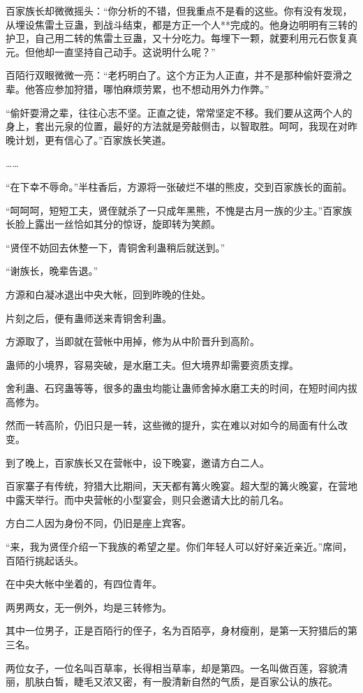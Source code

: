 \begin{this_body}
百家族长却微微摇头：“你分析的不错，但我重点不是看的这些。你有没有发现，从埋设焦雷土豆蛊，到战斗结束，都是方正一个人**完成的。他身边明明有三转的护卫，自己用二转的焦雷土豆蛊，又十分吃力。每埋下一颗，就要利用元石恢复真元。但他却一直坚持自己动手。这说明什么呢？”

百陌行双眼微微一亮：“老朽明白了。这个方正为人正直，并不是那种偷奸耍滑之辈。他答应参加狩猎，哪怕麻烦劳累，也不想动用外力作弊。”

“偷奸耍滑之辈，往往心志不坚。正直之徒，常常坚定不移。我们要从这两个人的身上，套出元泉的位置，最好的方法就是旁敲侧击，以智取胜。呵呵，我现在对昨晚计划，更有信心了。”百家族长笑道。

……

“在下幸不辱命。”半柱香后，方源将一张破烂不堪的熊皮，交到百家族长的面前。

“呵呵呵，短短工夫，贤侄就杀了一只成年黑熊，不愧是古月一族的少主。”百家族长脸上露出一丝恰如其分的惊讶，旋即转为笑颜。

“贤侄不妨回去休整一下，青铜舍利蛊稍后就送到。”

“谢族长，晚辈告退。”

方源和白凝冰退出中央大帐，回到昨晚的住处。

片刻之后，便有蛊师送来青铜舍利蛊。

方源取了，当即就在营帐中用掉，修为从中阶晋升到高阶。

蛊师的小境界，容易突破，是水磨工夫。但大境界却需要资质支撑。

舍利蛊、石窍蛊等等，很多的蛊虫均能让蛊师舍掉水磨工夫的时间，在短时间内拔高修为。

然而一转高阶，仍旧只是一转，这些微的提升，实在难以对如今的局面有什么改变。

到了晚上，百家族长又在营帐中，设下晚宴，邀请方白二人。

百家寨子有传统，狩猎大比期间，天天都有篝火晚宴。超大型的篝火晚宴，在营地中露天举行。而中央营帐的小型宴会，则只会邀请大比的前几名。

方白二人因为身份不同，仍旧是座上宾客。

“来，我为贤侄介绍一下我族的希望之星。你们年轻人可以好好亲近亲近。”席间，百陌行挑起话头。

在中央大帐中坐着的，有四位青年。

两男两女，无一例外，均是三转修为。

其中一位男子，正是百陌行的侄子，名为百陌亭，身材瘦削，是第一天狩猎后的第三名。

两位女子，一位名叫百草率，长得相当草率，却是第四。一名叫做百莲，容貌清丽，肌肤白皙，睫毛又浓又密，有一股清新自然的气质，是百家公认的族花。


\end{this_body}

